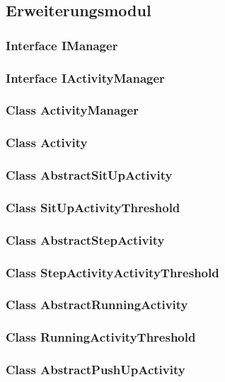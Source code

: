 \documentclass[a4paper,12pt]{article}
\begin{document}
\subsection{Erweiterungsmodul}
	\subsubsection{Interface IManager}
	
	\subsubsection{Interface IActivityManager}
	\subsubsection{Class ActivityManager}
	
	\subsubsection{Class Activity}
	
	\subsubsection{Class AbstractSitUpActivity}
	\subsubsection{Class SitUpActivityThreshold}
	
	\subsubsection{Class AbstractStepActivity}
	\subsubsection{Class StepActivityActivityThreshold}
	
	\subsubsection{Class AbstractRunningActivity}
	\subsubsection{Class RunningActivityThreshold}
	
	\subsubsection{Class AbstractPushUpActivity}
\end{document}
